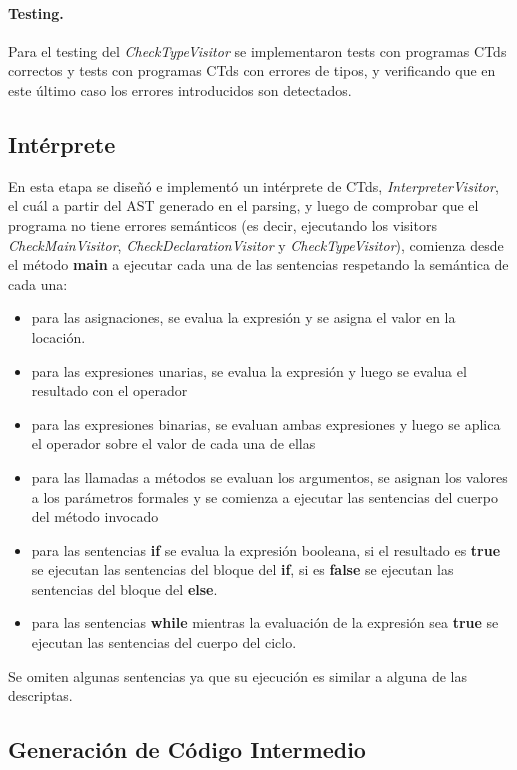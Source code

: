 \documentclass[11pt,a4paper]{article}
\begin{document}
\paragraph{Testing.} Para el testing del \textit{CheckTypeVisitor} se implementaron tests con programas CTds correctos y tests con programas CTds con errores de tipos, y verificando que en este último caso los errores introducidos son detectados.

\subsection{Intérprete} 
\label{subsec:interprete}

En esta etapa se diseñó e implementó un intérprete de CTds, \textit{InterpreterVisitor}, el cuál a partir del AST generado en el parsing, y luego de comprobar que el programa no tiene errores semánticos (es decir, ejecutando los visitors \textit{CheckMainVisitor}, \textit{CheckDeclarationVisitor} y \textit{CheckTypeVisitor}), comienza desde el método \textbf{main} a ejecutar cada una de las sentencias respetando la semántica de cada una:
\begin{itemize}
\item para las asignaciones, se evalua la expresión y se asigna el valor en la locación.
\item para las expresiones unarias, se evalua la expresión y luego se evalua el resultado con el operador
\item para las expresiones binarias, se evaluan ambas expresiones y luego se aplica el operador sobre el valor de cada una de ellas
\item para las llamadas a métodos se evaluan los argumentos, se asignan los valores a los parámetros formales y se comienza a ejecutar las sentencias del cuerpo del método invocado
\item para las sentencias \textbf{if} se evalua la expresión booleana, si el resultado es \textbf{true} se ejecutan las sentencias del bloque del \textbf{if}, si es \textbf{false} se ejecutan las sentencias del bloque del \textbf{else}.
\item para las sentencias \textbf{while} mientras la evaluación de la expresión sea \textbf{true} se ejecutan las sentencias del cuerpo del ciclo.
\end{itemize}
Se omiten algunas sentencias ya que su ejecución es similar a alguna de las descriptas. 

\subsection{Generación de Código Intermedio} 
\label{subsec:genci}
\end{document}

